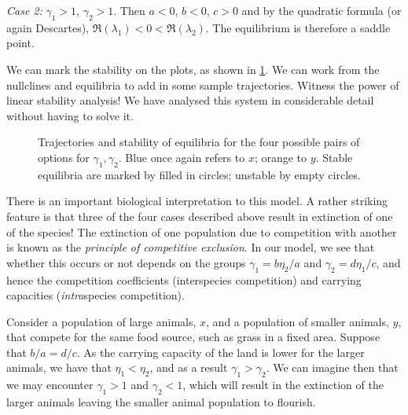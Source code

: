 \documentclass[main.tex]{subfiles}
\begin{document}
\emph{Case 2:} $\gamma_1>1$, $\gamma_2>1$. \quad Then $a<0$, $b<0$, $c>0$ and by the quadratic formula (or again Descartes), $\Re(\lambda_1)<0<\Re(\lambda_2)$. The equilibrium is therefore a saddle point.

We can mark the stability on the plots, as shown in \cref{fig:comp-lv-phase-options-traj}. We can work from the nullclines and equilibria to add in some sample trajectories. Witness the power of linear stability analysis! We have analysed this system in considerable detail without having to solve it.

\begin{figure}
\begin{subfigure}[t]{0.49\textwidth}
	\centering
	
\end{subfigure}
\begin{subfigure}[t]{0.49\textwidth}
	\centering
	
\end{subfigure}

\vspace{5mm}
\begin{subfigure}[t]{0.49\textwidth}
	\centering
	
\end{subfigure}
\begin{subfigure}[t]{0.49\textwidth}
	\centering
	
\end{subfigure}
\caption{Trajectories and stability of equilibria for the four possible pairs of options for $\gamma_1,\gamma_2$. Blue once again refers to $x$; orange to $y$. Stable equilibria are marked by filled in circles; unstable by empty circles.}
\label{fig:comp-lv-phase-options-traj}
\end{figure}

There is an important biological interpretation to this model. A rather striking feature is that three of the four cases described above result in extinction of one of the species! The extinction of one population due to competition with another is known as the \emph{principle of competitive exclusion}. In our model, we see that whether this occurs or not depends on the groups $\gamma_1 = b\eta_2/a$ and $\gamma_2 = d\eta_1/c$, and hence the competition coefficients (interspecies competition) and carrying capacities (\emph{intra}species competition). 

Consider a population of large animals, $x$, and a population of smaller animals, $y$, that compete for the same food source, such as grass in a fixed area. Suppose that $b/a = d/c$. As the carrying capacity of the land is lower for the larger animals, we have that $\eta_1 < \eta_2$, and as a result $\gamma_1 > \gamma_2$. We can imagine then that we may encounter $\gamma_1 > 1$ and $\gamma_2 < 1$, which will result in the extinction of the larger animals leaving the smaller animal population to flourish.
\end{document}
